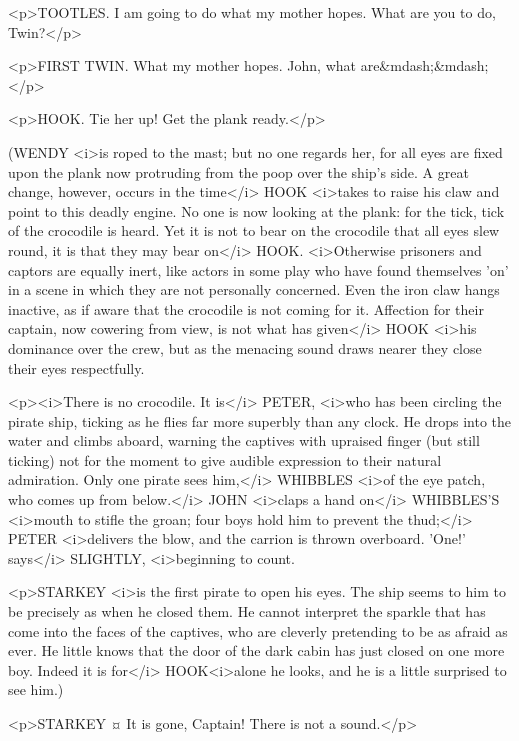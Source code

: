 <p>TOOTLES. I am going to do what my mother hopes. What are you to do, Twin?</p>

<p>FIRST TWIN. What my mother hopes. John, what are&mdash;&mdash;</p>

<p>HOOK. Tie her up! Get the plank ready.</p>

\begin{stagedir}
(WENDY <i>is roped to the mast; but no one regards her, for all eyes are fixed upon the plank now protruding from the poop over the ship's side. A great change, however, occurs in the time</i> HOOK <i>takes to raise his claw and point to this deadly engine. No one is now looking at the plank: for the tick, tick of the crocodile is heard. Yet it is not to bear on the crocodile that all eyes slew round, it is that they may bear on</i> HOOK. <i>Otherwise prisoners and captors are equally inert, like actors in some play who have found themselves 'on' in a scene in which they are not personally concerned. Even the iron claw hangs inactive, as if aware that the crocodile is not coming for it. Affection for their captain, now cowering from view, is not what has given</i> HOOK <i>his dominance over the crew, but as the menacing sound draws nearer they close their eyes respectfully.

<p><i>There is no crocodile. It is</i> PETER, <i>who has been circling the pirate ship, ticking as he flies far more superbly than any clock. He drops into the water and climbs aboard, warning the captives with upraised finger (but still ticking) not for the moment to give audible expression to their natural admiration. Only one pirate sees him,</i> WHIBBLES <i>of the eye patch, who comes up from below.</i> JOHN <i>claps a hand on</i> WHIBBLES'S <i>mouth to stifle the groan; four boys hold him to prevent the thud;</i> PETER <i>delivers the blow, and the carrion is thrown overboard. 'One!' says</i> SLIGHTLY, <i>beginning to count.

<p>STARKEY <i>is the first pirate to open his eyes. The ship seems to him to be precisely as when he closed them. He cannot interpret the sparkle that has come into the faces of the captives, who are cleverly pretending to be as afraid as ever. He little knows that the door of the dark cabin has just closed on one more boy. Indeed it is for</i> HOOK<i>alone he looks, and he is a little surprised to see him.)
\end{stagedir}

<p>STARKEY ¤
It is gone, Captain! There is not a sound.</p>


